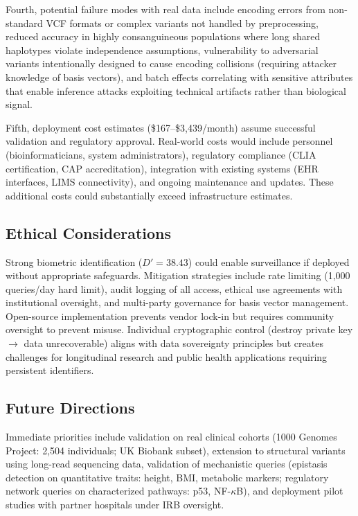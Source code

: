 \documentclass[11pt,letterpaper]{article}
\begin{document}
Fourth, potential failure modes with real data include encoding errors from non-standard VCF formats or complex variants not handled by preprocessing, reduced accuracy in highly consanguineous populations where long shared haplotypes violate independence assumptions, vulnerability to adversarial variants intentionally designed to cause encoding collisions (requiring attacker knowledge of basis vectors), and batch effects correlating with sensitive attributes that enable inference attacks exploiting technical artifacts rather than biological signal.

Fifth, deployment cost estimates (\$167--\$3,439/month) assume successful validation and regulatory approval. Real-world costs would include personnel (bioinformaticians, system administrators), regulatory compliance (CLIA certification, CAP accreditation), integration with existing systems (EHR interfaces, LIMS connectivity), and ongoing maintenance and updates. These additional costs could substantially exceed infrastructure estimates.

\subsection{Ethical Considerations}

Strong biometric identification ($D' = 38.43$) could enable surveillance if deployed without appropriate safeguards. Mitigation strategies include rate limiting (1,000 queries/day hard limit), audit logging of all access, ethical use agreements with institutional oversight, and multi-party governance for basis vector management. Open-source implementation prevents vendor lock-in but requires community oversight to prevent misuse. Individual cryptographic control (destroy private key $\rightarrow$ data unrecoverable) aligns with data sovereignty principles but creates challenges for longitudinal research and public health applications requiring persistent identifiers.

\subsection{Future Directions}

Immediate priorities include validation on real clinical cohorts (1000 Genomes Project: 2,504 individuals; UK Biobank subset), extension to structural variants using long-read sequencing data, validation of mechanistic queries (epistasis detection on quantitative traits: height, BMI, metabolic markers; regulatory network queries on characterized pathways: p53, NF-$\kappa$B), and deployment pilot studies with partner hospitals under IRB oversight.
\end{document}
